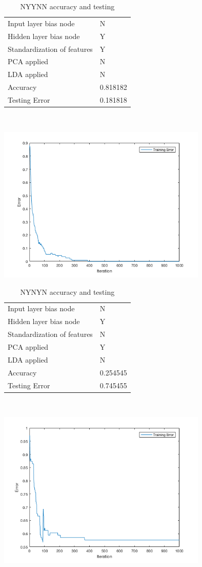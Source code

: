 \documentclass[12pt]{article}
\newcommand{\accuracyAndTestErrorTable}[8]{
  \begin{tabular}{l|l}
    \hline
    Input layer bias node & #1 \\
    Hidden layer bias node & #2 \\
    Standardization of features & #3 \\
    PCA applied & #4 \\
    LDA applied & #5 \\
    \hline
    Accuracy & #6 \\
    Testing Error & #7 \\
    \hline
  \end{tabular}
  ~\\[60pt]
  \caption{#8}
}
\begin{document}


\begin{center}
  \begin{table}[H]
    \begin{varwidth}[b]{0.4\linewidth}
      \centering
      \accuracyAndTestErrorTable{N}{Y}{Y}{N}{N}{0.818182}{0.181818}{NYYNN accuracy and testing}
      \label{table:NYYNN}
    \end{varwidth}%
    \hfill
    \begin{minipage}[b]{0.6\linewidth}
      \centering
      \includegraphics[width=100mm]{NYYNN_training_error.png}
      \label{fig:NYYNN}
    \end{minipage}
  \end{table}
\end{center}

\begin{center}
  \begin{table}[H]
    \begin{varwidth}[b]{0.4\linewidth}
      \centering
      \accuracyAndTestErrorTable{N}{Y}{N}{Y}{N}{0.254545}{0.745455}{NYNYN accuracy and testing}
      \label{table:NYNYN}
    \end{varwidth}%
    \hfill
    \begin{minipage}[b]{0.6\linewidth}
      \centering
      \includegraphics[width=100mm]{NYNYN_training_error.png}
      \label{fig:NYNYN}
    \end{minipage}
  \end{table}
\end{center}
\end{document}
